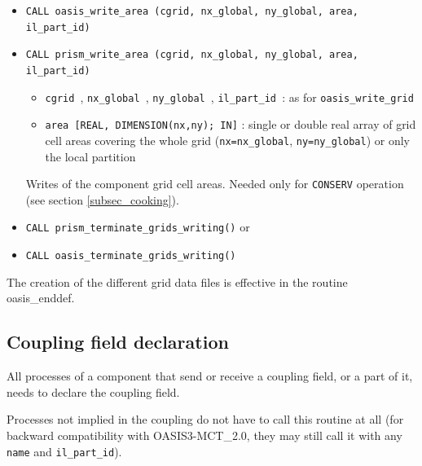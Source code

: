 \begin{itemize}
  \vspace{0.2cm}
\item {\tt CALL oasis\_write\_area (cgrid, nx\_global, ny\_global, area, il\_part\_id)}
\item {\tt CALL prism\_write\_area (cgrid, nx\_global, ny\_global, area, il\_part\_id)}

  \begin{itemize}
  \item {\tt cgrid }, {\tt nx\_global }, {\tt ny\_global }, {\tt il\_part\_id }: as for {\tt oasis\_write\_grid}
  \item {\tt area [REAL, DIMENSION(nx,ny); IN]} : single or double real array of grid cell
    areas covering the whole grid ({\tt nx=nx\_global}, {\tt ny=ny\_global}) or only the local partition 
  \end{itemize}
  Writes of the component grid cell areas. Needed only for {\tt CONSERV}
  operation (see section \ref{subsec_cooking}).

  \vspace{0.2cm}
\item {\tt CALL prism\_terminate\_grids\_writing()} or
\item {\tt CALL oasis\_terminate\_grids\_writing()}

\end{itemize}

The creation of the different grid data files is effective in the routine
oasis\_enddef.

\subsection{Coupling field declaration}
\label{subsubsec_Declaration}

All processes of a component that send or receive a coupling field, or a part of it, needs to declare the coupling field.
 
Processes not implied in the
coupling do not have to call this routine at all (for backward
compatibility with OASIS3-MCT\_2.0, they may still call it with any {\tt name} and {\tt il\_part\_id}).

